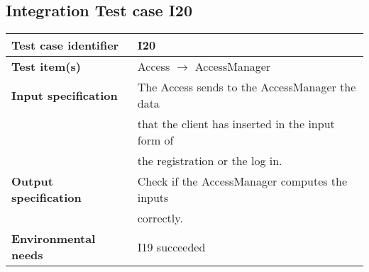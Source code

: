 \documentclass[18pt,oneside,a4paper, titlepage]{article}
\begin{document}
	\subsection{Integration Test case I20}
		\begin{tabular}{ l l}
			\hline 		\textbf{Test case identifier} & I20 \\
			\hline		\textbf{Test item(s)}  & Access $\rightarrow$ AccessManager \\
			\hline		\textbf{Input specification} & The Access sends to the AccessManager the data\\ & that the client has inserted in the input form of \\ & the registration or the log in.\\
			\hline		\textbf{Output specification} & Check if the AccessManager computes the inputs\\ & correctly.\\
			\hline		\textbf{Environmental needs} & I19 succeeded\\
			\hline
		\end{tabular}
\end{document}
